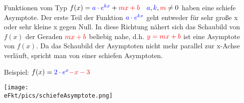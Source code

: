 Funktionen vom Typ \(f(x)=\textcolor{blue}{a\cdot e^{kx}}+\textcolor{red}{mx+b}\quad \textcolor{blue}{a},\textcolor{blue}{k}, \textcolor{red}{m}\neq 0\) haben eine schiefe Asymptote. Der erste Teil der Funktion \(\textcolor{blue}{a\cdot e^{kx}}\) geht entweder für sehr große x oder sehr kleine x gegen Null. In diese Richtung nähert sich das Schaubild von \(f(x)\) der Geraden \(\textcolor{red}{mx+b}\) beliebig nahe, d.h. \(\textcolor{red}{y=mx+b}\) ist eine Asymptote von \(f(x)\). Da das Schaubild der Asymptoten nicht mehr parallel zur x-Achse verläuft, spricht man von einer schiefen Asymptoten.

Beispiel: \(f(x)=\textcolor{blue}{2\cdot e^{x}}\textcolor{red}{-x-3}\)

\begin{minipage}{\linewidth}
	\centering
	\texttt{[image: \\eFkt/pics/schiefeAsymptote.png]}
\end{minipage}

\smallskip


